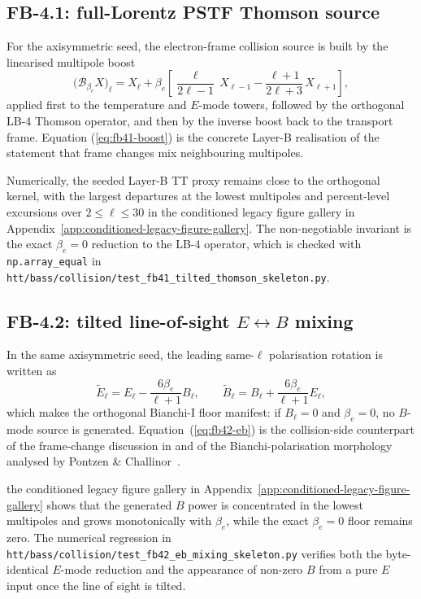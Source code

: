 \subsection{FB-4.1: full-Lorentz PSTF Thomson source}

For the axisymmetric seed, the electron-frame collision source
is built by the linearised multipole boost
\cite{Challinor2000}
\begin{equation}\label{eq:fb41-boost}
\bigl(\mathcal{B}_{\beta_e} X\bigr)_\ell
=
X_\ell
+
\beta_e
\left[
\frac{\ell}{2\ell-1}\,X_{\ell-1}
-
\frac{\ell+1}{2\ell+3}\,X_{\ell+1}
\right],
\end{equation}
applied first to the temperature and $E$-mode towers,
followed by the orthogonal LB-4 Thomson operator, and then by
the inverse boost back to the transport frame.  Equation
(\ref{eq:fb41-boost}) is the concrete Layer-B realisation of the
statement that frame changes mix neighbouring multipoles.

Numerically, the seeded Layer-B TT proxy remains close to the
orthogonal kernel, with the largest departures at the lowest
multipoles and percent-level excursions over
$2 \le \ell \le 30$ in the conditioned legacy figure gallery in Appendix~\ref{app:conditioned-legacy-figure-gallery}.  The
non-negotiable invariant is the exact $\beta_e = 0$ reduction to
the LB-4 operator, which is checked with
\texttt{np.array\_equal} in
\texttt{htt/bass/collision/test\_fb41\_tilted\_thomson\_skeleton.py}.


\subsection{FB-4.2: tilted line-of-sight $E \leftrightarrow B$ mixing}

In the same axisymmetric seed, the leading same-$\ell$
polarisation rotation is written as
\begin{equation}\label{eq:fb42-eb}
\tilde E_\ell
=
E_\ell - \frac{6\beta_e}{\ell+1} B_\ell,
\qquad
\tilde B_\ell
=
B_\ell + \frac{6\beta_e}{\ell+1} E_\ell,
\end{equation}
which makes the orthogonal Bianchi-I floor manifest:
if $B_\ell = 0$ and $\beta_e = 0$, no $B$-mode source is
generated.  Equation~(\ref{eq:fb42-eb}) is the collision-side
counterpart of the frame-change discussion in
\cite{Challinor2000} and of the Bianchi-polarisation morphology
analysed by Pontzen \& Challinor~\cite{Pontzen2011}.

the conditioned legacy figure gallery in Appendix~\ref{app:conditioned-legacy-figure-gallery} shows that the generated $B$ power
is concentrated in the lowest multipoles and grows monotonically
with $\beta_e$, while the exact $\beta_e = 0$ floor remains zero.
The numerical regression in
\texttt{htt/bass/collision/test\_fb42\_eb\_mixing\_skeleton.py}
verifies both the byte-identical $E$-mode reduction and the
appearance of non-zero $B$ from a pure $E$ input once the line of
sight is tilted.


